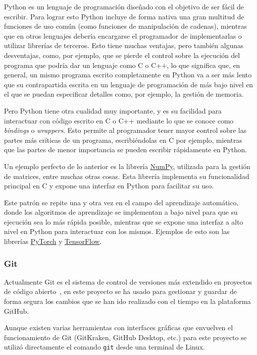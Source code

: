 Python es un lenguaje de programación diseñado con el objetivo de ser fácil de
escribir. Para lograr esto Python incluye de forma nativa una gran multitud de
funciones de uso común (como funciones de manipulación de cadenas), mientras que
en otros lenguajes debería encargarse el programador de implementarlas o
utilizar librerías de terceros. Esto tiene muchas ventajas, pero también algunas
desventajas, como, por ejemplo, que se pierde el control sobre la ejecución del
programa que podría dar un lenguaje como C o C++, lo que significa que, en
general, un mismo programa escrito completamente en Python va a ser más lento
que su contrapartida escrita en un lenguaje de programación de más bajo nivel en
el que se puedan especificar detalles como, por ejemplo, la gestión de memoria.

Pero Python tiene otra cualidad muy importante, y es su facilidad para
interactuar con código escrito en C o C++ mediante lo que se conoce como
\textit{bindings} o \textit{wrappers}. Esto permite al programador tener mayor
control sobre las partes más críticas de un programa, escribiéndolas en C por
ejemplo, mientras que las partes de menor importancia se pueden escribir
rápidamente en Python.

Un ejemplo perfecto de lo anterior es la librería
\href{https://github.com/numpy/numpy}{NumPy}, utilizada para la gestión de
matrices, entre muchas otras cosas. Esta librería implementa su funcionalidad
principal en C y expone una interfaz en Python para facilitar su uso.

Este patrón se repite una y otra vez en el campo del aprendizaje automático,
donde los algoritmos de aprendizaje se implementan a bajo nivel para que su
ejecución sea lo más rápida posible, mientras que se expone una interfaz a alto
nivel en Python para interactuar con los mismos. Ejemplos de esto son las
librerías \href{https://github.com/pytorch/pytorch}{PyTorch} y
\href{https://github.com/tensorflow/tensorflow}{TensorFlow}.

\subsubsection{Git}

Actualmente Git es el sistema de control de versiones más extendido en proyectos
de código abierto~\cite{OpenHubVCS}, en este proyecto se ha usado para gestionar
y guardar de forma segura los cambios que se han ido realizado con el tiempo en
la plataforma GitHub.

Aunque existen varias herramientas con interfaces gráficas que envuelven el
funcionamiento de Git (GitKraken, GitHub Desktop, etc.) para este proyecto se
utilizó directamente el comando \texttt{git} desde una terminal de Linux.

